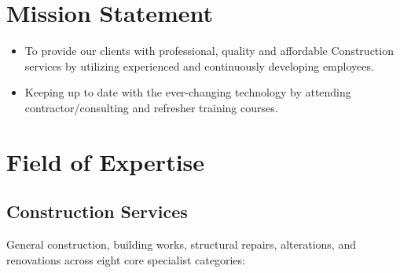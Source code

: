 \documentclass[a4paper,11pt]{article}
\begin{document}
\section{Mission Statement}

\begin{tcolorbox}[
  enhanced, colback=white, colframe=awenMidGrey, 
  boxrule=0.8pt, arc=4pt, top=10pt, bottom=10pt, left=12pt, right=12pt
]
\begin{itemize}[label=\textcolor{awenGold}{\faCheckSquare}, itemsep=6pt, font=\color{awenDarkGrey}]
  \item To provide our clients with professional, quality and affordable Construction services by utilizing experienced and continuously developing employees.
  \item Keeping up to date with the ever-changing technology by attending contractor/consulting and refresher training courses.
\end{itemize}
\end{tcolorbox}

\newpage

\section{Field of Expertise}

\subsection{Construction Services}

\color{awenDarkGrey}
General construction, building works, structural repairs, alterations, and renovations across eight core specialist categories:

\vspace{0.4cm}
\end{document}
